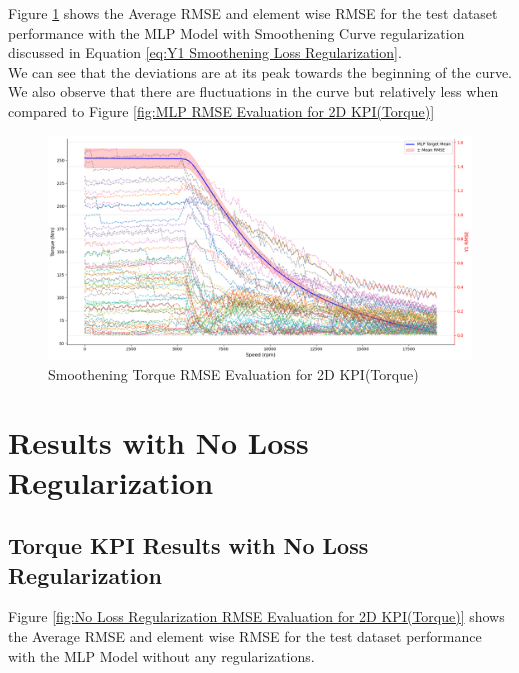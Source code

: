 \documentclass{report} %
\begin{document}
Figure \ref{fig:Smoothening Torque RMSE Evaluation for 2D KPI(Torque)} shows the Average \ac{RMSE} and element wise \ac{RMSE} for the test dataset performance with the MLP Model with Smoothening Curve regularization discussed in Equation \ref{eq:Y1 Smoothening Loss Regularization}.\\
We can see that the deviations are at its peak towards the beginning of the curve. 
We also observe that there are fluctuations in the curve but relatively less when compared to Figure \ref{fig:MLP RMSE Evaluation for 2D KPI(Torque)}\\
\begin{figure}[H]
    \centering
    \includegraphics[width=1\textwidth]{./ReportImages/RMSE_MLP_Smoothening_y1.png} 
    \caption{Smoothening Torque \ac{RMSE} Evaluation for 2D KPI(Torque)} 
    \label{fig:Smoothening Torque RMSE Evaluation for 2D KPI(Torque)}
\end{figure}

\section{Results with No Loss Regularization}\label{sec:Results with No Loss Regularization}

\subsection{Torque \ac{KPI} Results with No Loss Regularization}\label{subsec:2D Torque Results with No Loss Regularization}

Figure \ref{fig:No Loss Regularization RMSE Evaluation for 2D KPI(Torque)} shows the Average \ac{RMSE} and element wise \ac{RMSE} for the test dataset performance with the MLP Model without any regularizations.\\
\end{document}
